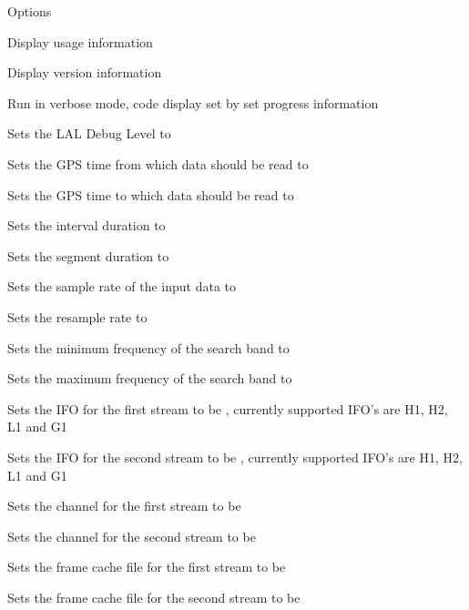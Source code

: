 \begin{entry}
\item[Options]\leavevmode
\begin{entry}
\item[\option{--help}]
Display usage information
\item[\option{--version}]
Display version information
\item[\option{--verbose}]
Run in verbose mode, code display set by set progress information
\item[\option{--debug-level} \parm{N}]
Sets the LAL Debug Level to 
\item[\option{--gps-start-time} \parm{N}]
Sets the GPS time from which data should be read to 
\item[\option{--gps-end-time} \parm{N}]
Sets the GPS time to which data should be read to 
\item[\option{--interval-duration} \parm{N}]
Sets the interval duration to 
\item[\option{--segment-duration} \parm{N}]
Sets the segment duration to 
\item[\option{--sample-rate} \parm{N}]
Sets the sample rate of the input data to 
\item[\option{--resample-rate} \parm{N}]
Sets the resample rate to 
\item[\option{--f-min} \parm{N}]
Sets the minimum frequency of the search band to 
\item[\option{--f-max} \parm{N}]
Sets the maximum frequency of the search band to 
\item[\option{--ifo-one} \parm{IFO}]
Sets the IFO for the first stream to be , currently supported
IFO's are H1, H2, L1 and G1
\item[\option{--ifo-two} \parm{IFO}]
Sets the IFO for the second stream to be , currently supported
IFO's are H1, H2, L1 and G1
\item[\option{--channel-one} \parm{CHANNEL}]
Sets the channel for the first stream to be 
\item[\option{--channel-two} \parm{CHANNEL}]
Sets the channel for the second stream to be 
\item[\option{--frame-cache-one} \parm{FILE}]
Sets the frame cache file for the first stream to be 
\item[\option{--frame-cache-two} \parm{FILE}]
Sets the frame cache file for the second stream to be 
\item[\option{--calibration-cache-one} \parm{FILE}]

\end{entry}
\end{entry}
